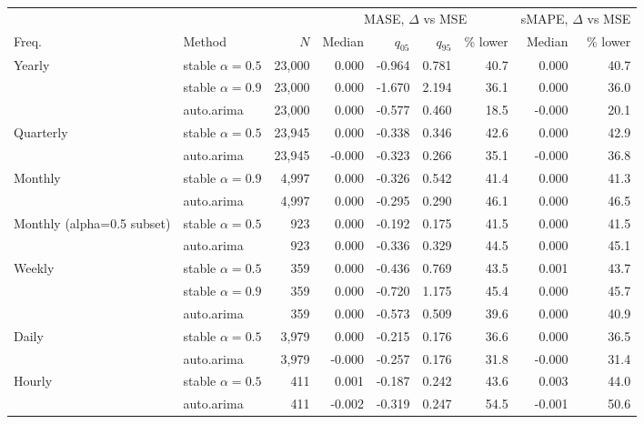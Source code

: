 \begin{tabular}{llrrrrrrr}
\toprule
 & & & \multicolumn{4}{c}{MASE, $\Delta$ vs MSE} & \multicolumn{2}{c}{sMAPE, $\Delta$ vs MSE} \\
\cmidrule(lr){4-7}\cmidrule(lr){8-9}
Freq. & Method & $N$ & Median & $q_{05}$ & $q_{95}$ & \% lower & Median & \% lower \\
\midrule
Yearly & stable $\alpha=0.5$ & 23{,}000 & 0.000 & -0.964 & 0.781 & 40.7 & 0.000 & 40.7 \\
 & stable $\alpha=0.9$ & 23{,}000 & 0.000 & -1.670 & 2.194 & 36.1 & 0.000 & 36.0 \\
 & auto.arima & 23{,}000 & 0.000 & -0.577 & 0.460 & 18.5 & -0.000 & 20.1 \\
\addlinespace
Quarterly & stable $\alpha=0.5$ & 23{,}945 & 0.000 & -0.338 & 0.346 & 42.6 & 0.000 & 42.9 \\
 & auto.arima & 23{,}945 & -0.000 & -0.323 & 0.266 & 35.1 & -0.000 & 36.8 \\
\addlinespace
Monthly & stable $\alpha=0.9$ & 4{,}997 & 0.000 & -0.326 & 0.542 & 41.4 & 0.000 & 41.3 \\
 & auto.arima & 4{,}997 & 0.000 & -0.295 & 0.290 & 46.1 & 0.000 & 46.5 \\
\addlinespace
Monthly (alpha=0.5 subset) & stable $\alpha=0.5$ & 923 & 0.000 & -0.192 & 0.175 & 41.5 & 0.000 & 41.5 \\
 & auto.arima & 923 & 0.000 & -0.336 & 0.329 & 44.5 & 0.000 & 45.1 \\
\addlinespace
Weekly & stable $\alpha=0.5$ & 359 & 0.000 & -0.436 & 0.769 & 43.5 & 0.001 & 43.7 \\
 & stable $\alpha=0.9$ & 359 & 0.000 & -0.720 & 1.175 & 45.4 & 0.000 & 45.7 \\
 & auto.arima & 359 & 0.000 & -0.573 & 0.509 & 39.6 & 0.000 & 40.9 \\
\addlinespace
Daily & stable $\alpha=0.5$ & 3{,}979 & 0.000 & -0.215 & 0.176 & 36.6 & 0.000 & 36.5 \\
 & auto.arima & 3{,}979 & -0.000 & -0.257 & 0.176 & 31.8 & -0.000 & 31.4 \\
\addlinespace
Hourly & stable $\alpha=0.5$ & 411 & 0.001 & -0.187 & 0.242 & 43.6 & 0.003 & 44.0 \\
 & auto.arima & 411 & -0.002 & -0.319 & 0.247 & 54.5 & -0.001 & 50.6 \\
\bottomrule
\end{tabular}
